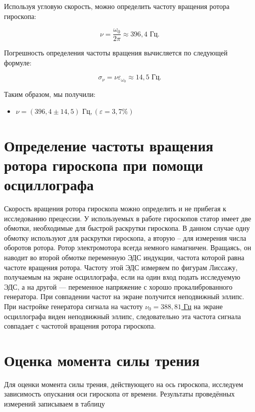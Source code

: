 \documentclass[a4paper,12pt]{article} %
\begin{document}
Используя угловую скорость, можно определить частоту вращения ротора гироскопа:

\begin{equation}
\nu = \frac{\omega_0}{2\pi} \approx 396,4 \text{ Гц}.
\end{equation}

Погрешность определения частоты вращения вычисляется по следующей формуле:

\begin{equation}
\sigma_\nu = \nu \varepsilon_{\omega_0} \approx 14,5 \text{ Гц}.
\end{equation}

Таким образом, мы получили:

\begin{itemize}
	\item \underline{$ \nu = \left( 396,4 \pm 14,5 \right) \text{ Гц}, \left( \varepsilon = 3,7 \% \right)   $}
\end{itemize}

\section{Определение частоты вращения ротора гироскопа при помощи осциллографа}

Скорость вращения ротора гироскопа можно определить и не прибегая к исследованию прецессии. У используемых в работе гироскопов статор имеет две обмотки, необходимые для быстрой раскрутки гироскопа. В данном случае одну обмотку используют для раскрутки гироскопа, а вторую -- для измерения числа оборотов ротора. Ротор электромотора всегда немного намагничен. Вращаясь, он наводит во второй обмотке переменную ЭДС индукции, частота которой равна частоте вращения ротора. Частоту этой ЭДС измеряем по фигурам Лиссажу, получаемым на экране осциллографа, если на один вход подать исследуемую ЭДС, а на другой — переменное напряжение с хорошо прокалиброванного генератора. При совпадении частот на экране получится неподвижный эллипс.\\
При настройке генератора сигнала на частоту \underline{$ \nu_0 = 388,81$ Гц} на экране осциллографа виден  неподвижный эллипс, следовательно эта частота сигнала совпадает с частотой вращения ротора гироскопа.

\section{Оценка момента силы трения}

Для оценки момента силы трения, действующего на ось гироскопа, исследуем зависимость опускания оси гироскопа от времени. Результаты проведённых измерений записываем в таблицу 
\end{document}
